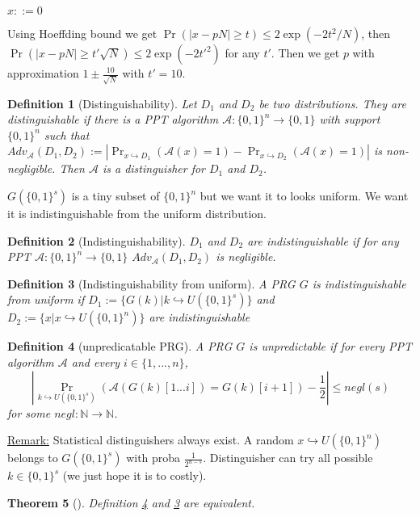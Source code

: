 \documentclass{article}
\newtheorem{thm}{Theorem}[section]
\newtheorem{defi}[thm]{Definition}
\newcommand{\Thm}[3]{\begin{thm}[#1]\label{#2}#3\end{thm}}
\newcommand{\Def}[3]{\begin{defi}[#1]\label{#2}#3\end{defi}}
\newcommand{\Rem}{\underline{Remark:} }
\newcommand{\N}{\mathbb{N}}
\newcommand{\A}{\mathcal{A}}
\begin{document}
\begin{algorithme}
$x::=0$\\
\end{algorithme}

Using Hoeffding bound we get $\Pr(|x-pN|\geq t)\leq 2\exp(-2t^2/N)$, then $\Pr(|x-pN|\geq t'\sqrt{N})\leq 2\exp(-2t'^2)$ for any $t'$. Then we get $p$ with approximation $1\pm\frac{10}{\sqrt{N}}$ with $t'=10$.


\Def{Distinguishability}{def:disting}{Let $D_1$ and $D_2$ be two distributions. They are distinguishable if there is a PPT algorithm $\mathcal{A}:\{0,1\}^n\rightarrow\{0,1\}$ with support $\{0,1\}^n$ such that $Adv_\mathcal{A}(D_1,D_2) := |\Pr_{x\hookrightarrow D_1}(\mathcal{A}(x)=1)-\Pr_{x\hookrightarrow D_2}(\mathcal{A}(x)=1)|$ is non-negligible. Then $\mathcal{A}$ is a distinguisher for $D_1$ and $D_2$.}

$G(\{0,1\}^s)$ is a tiny subset of $\{0,1\}^n$ but we want it to looks uniform. We want it is indistinguishable from the uniform distribution.

\Def{Indistinguishability}{def:indisting}{$D_1$ and $D_2$ are indistinguishable if for any PPT $\mathcal{A}:\{0,1\}^n\rightarrow\{0,1\}$ $Adv_\mathcal{A}(D_1,D_2)$ is negligible.}

\Def{Indistinguishability from uniform}{def:unifPRG}{A PRG $G$ is indistinguishable from uniform if $D_1:=\{G(k)|k\hookrightarrow U(\{0,1\}^s)\}$ and $D_2:=\{x|x\hookrightarrow U(\{0,1\}^n)\}$ are indistinguishable} 

\Def{unpredicatable PRG}{def:unpredPRG}{A PRG $G$ is unpredictable if for every PPT algorithm $\A$ and every $i\in\{1,...,n\}$,
\[|\Pr_{k\hookrightarrow U(\{0,1\}^s)}(\A(G(k)[1...i])=G(k)[i+1])-\frac{1}{2}|\leq negl(s)\]
for some $negl:\N\rightarrow\N$.
}

\Rem Statistical distinguishers always exist. A random $x\hookrightarrow U(\{0,1\}^n)$ belongs to $G(\{0,1\}^s)$ with proba $\frac{1}{2^{n-s}}$. Distinguisher can try all possible $k\in\{0,1\}^s$ (we just hope it is to costly).

\Thm{}{thm:indisUnpredEquiv}{Definition \ref{def:unpredPRG} and \ref{def:unifPRG} are equivalent.}
\end{document}
